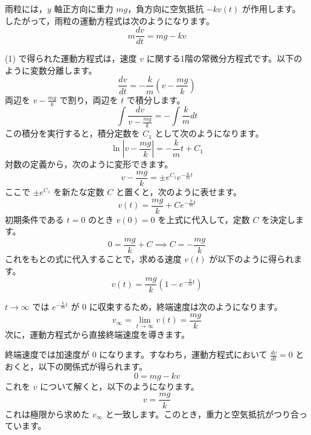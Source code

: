 \solutionheading
\begin{solutionparts}

雨粒には，$y$ 軸正方向に重力 $mg$，負方向に空気抵抗 $-kv(t)$ が作用します。 したがって，雨粒の運動方程式は次のようになります。
\begin{equation*}
m \frac{dv}{dt} = mg - kv
\end{equation*}

(1) で得られた運動方程式は，速度 $v$ に関する1階の常微分方程式です。以下のように変数分離します。
\begin{equation*}
\frac{dv}{dt} = -\frac{k}{m} \left( v - \frac{mg}{k} \right)
\end{equation*}
両辺を $v - \frac{mg}{k}$ で割り，両辺を $t$ で積分します。
\begin{equation*}
\int \frac{dv}{v - \frac{mg}{k}} = -\int \frac{k}{m} dt
\end{equation*}
この積分を実行すると，積分定数を $C_1$ として次のようになります。
\begin{equation*}
\ln \left| v - \frac{mg}{k} \right| = -\frac{k}{m} t + C_1
\end{equation*}
対数の定義から，次のように変形できます。
\begin{equation*}
v - \frac{mg}{k} = \pm e^{C_1} e^{-\frac{k}{m} t}
\end{equation*}
ここで $\pm e^{C_1}$ を新たな定数 $C$ と置くと，次のように表せます。
\begin{equation*}
v(t) = \frac{mg}{k} + C e^{-\frac{k}{m} t}
\end{equation*}
初期条件である $t = 0$ のとき $v(0) = 0$ を上式に代入して，定数 $C$ を決定します。
\begin{equation*}
0 = \frac{mg}{k} + C \implies C = -\frac{mg}{k}
\end{equation*}
これをもとの式に代入することで，求める速度 $v(t)$ が以下のように得られます。
\begin{equation*}
v(t) = \frac{mg}{k} \left( 1 - e^{-\frac{k}{m} t} \right)
\end{equation*}

$t \to \infty$ では $e^{-\frac{k}{m} t}$ が 0 に収束するため，終端速度は次のようになります。
\begin{equation*}
v_{\infty} = \lim_{t \to \infty} v(t) = \frac{mg}{k}
\end{equation*}
次に，運動方程式から直接終端速度を導きます。
\par
終端速度では加速度が 0 になります。すなわち，運動方程式において $\frac{dv}{dt} = 0$ とおくと，以下の関係式が得られます。
\begin{equation*}
0 = mg - kv
\end{equation*}
これを $v$ について解くと，以下のようになります。
\begin{equation*}
v = \frac{mg}{k}
\end{equation*}
これは極限から求めた $v_{\infty}$ と一致します。このとき，重力と空気抵抗がつり合っています。


\end{solutionparts}
